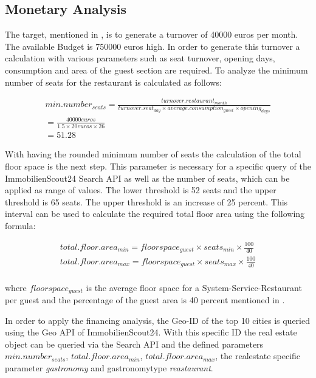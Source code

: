 \subsection{Monetary Analysis}
\label{subsec:moneten}
The target, mentioned in , is to generate a turnover of 40000 euros per month. The available Budget
 is 750000 euros high. In order to generate this turnover a calculation with various parameters such as seat turnover,
 opening days, consumption and area of the guest section are required. To analyze the minimum number of seats for the
 restaurant is calculated as follows:
\begin{center}
\begin{equation}
\begin{aligned}
	min.number_{seats} = \frac{turnover.restaurant_{month}}{turnover.seat_{day} \times average.consumption_{guest} \times opening_{days}} \\
	= \frac{40000 euros}{1.5 \times 20 euros \times 26} \\
	= 51.28
\end{aligned}
\label{eq:number_seats_benchmark}
\end{equation}
\end{center}

With having the rounded minimum number of seats the calculation of the total floor space is the next step. This parameter is
 necessary for a specific query of the ImmobilienScout24 Search API \cite{ImmoScout} as well as the number of seats,
 which can be applied as range of values. The lower threshold is 52 seats and the upper threshold is 65 seats. The upper
 threshold is an increase of 25 percent. This interval can be used to calculate the required total floor area using the
 following formula:

\begin{equation}
\begin{aligned}
	total.floor.area_{min} = floorspace_{guest} \times seats_{min} \times \frac{100}{40} \\
	total.floor.area_{max} = floorspace_{guest} \times seats_{max} \times \frac{100}{40} \\
\end{aligned}
\label{eq:total_floor_space}
\end{equation}

where $floorspace_{guest}$ is the average floor space for a System-Service-Restaurant per guest \cite{FlaecheGast} and the
 percentage of the guest area is 40 percent mentioned in \cite{FlaecheGastronomie}.

 In order to apply the financing analysis, the Geo-ID of the top 10 cities is queried using the Geo \ac{API} of
 ImmobilienScout24. With this specific ID the real estate object can be queried via the Search \ac{API} and the
 defined parameters $min.number_{seats}$, $total.floor.area_{min}$, $total.floor.area_{max}$, the realestate specific
 parameter \textit{gastronomy} and gastronomytype \textit{reastaurant}.



